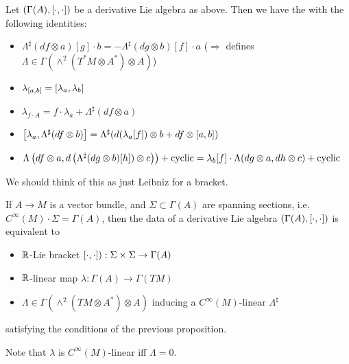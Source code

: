 \documentclass{article}
\begin{document}
\begin{prop}
Let $(\Gamma(A), \comm[\cdot]{\cdot})$ be a derivative Lie algebra as above. Then we have the 
with the following identities: 
\begin{itemize}
    \item $\Lambda^\sharp(df \otimes a)[g] \cdot b = - \Lambda^\sharp(dg \otimes b)[f] \cdot a$ ($\Rightarrow$ defines $\Lambda\in \Gamma(\wedge^2(T^\ast M \otimes A^\ast)\otimes A)$)
    \item $\lambda_{\comm[a]{b}} = \comm[\lambda_a]{\lambda_b}$ 
    \item $\lambda_{f\cdot A} = f \cdot \lambda_a + \Lambda^\sharp(df \otimes a)$
    \item $\comm[\lambda_a]{\Lambda^\sharp(df \otimes b)} = \Lambda^\sharp(d(\lambda_a[f]) \otimes b + df \otimes \comm[a]{b})$ 
    \item $\Lambda\pround{df \otimes a,d\pround{\Lambda^\sharp(dg \otimes b)[h]) \otimes c}} + \text{cyclic} = \lambda_b[f] \cdot \Lambda(dg \otimes a, dh \otimes c) + \text{cyclic}$
\end{itemize}
\end{prop}

\begin{remark}
We should think of this as just Leibniz for a bracket. 
\end{remark}

\begin{prop}
If $A \to M$ is a vector bundle, and $\Sigma \subset \Gamma(A)$ are spanning sections, i.e. $C^\infty(M) \cdot \Sigma = \Gamma(A)$, then the data of a derivative Lie algebra $(\Gamma(A), \comm[\cdot]{\cdot})$ is equivalent to 
\begin{itemize}
    \item $\mbb{R}$-Lie bracket $\comm[\cdot]{\cdot}):\Sigma\times \Sigma \to \Gamma(A) $
    \item $\mbb{R}$-linear map $\lambda : \Gamma(A) \to \Gamma(TM)$
    \item $\Lambda \in \Gamma(\wedge^2(TM \otimes A^\ast ) \otimes A)$ inducing a $C^\infty(M)$-linear $\Lambda^\sharp$
\end{itemize}
satisfying the conditions of the previous proposition. 
\end{prop}

Note that $\lambda$ is $C^\infty(M)$-linear iff $\Lambda=0$. 
\end{document}
